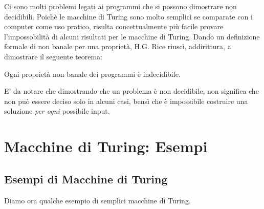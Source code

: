 Ci sono molti problemi legati ai programmi che si possono dimostrare
non decidibili. Poich\`e le macchine di Turing sono molto semplici se
comparate con i computer come uso pratico, risulta concettualmente
pi\`u facile provare l'impossobilit\`a di alcuni risultati per le
macchine di Turing. Dando un definizione formale di non banale per una
propriet\`a, H.G. Rice riusc\`i, addirittura, a dimostrare il seguente
teorema:

\begin{teorema}
Ogni propriet\`a non banale dei programmi \`e indecidibile.
\end{teorema}

E' da notare che dimostrando che un problema \`e non decidibile, non
significa che non pu\`o essere deciso solo in alcuni casi, bens\`i che
\`e impossibile costruire una soluzione \textit{per ogni} possibile
input.




\chapter{Macchine di Turing: Esempi}


\section{Esempi di Macchine di Turing}
Diamo ora qualche esempio di semplici macchine di Turing.\\

